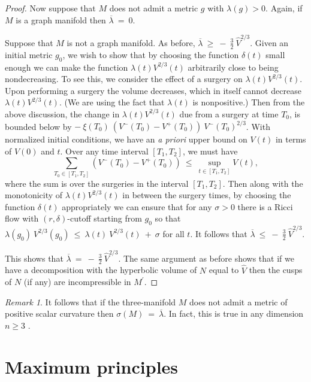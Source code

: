 \documentclass[12pt]{amsart}
\numberwithin{equation}{section}
\theoremstyle{plain}
\theoremstyle{definition}
\theoremstyle{remark}
\newtheorem{remark}[equation]{Remark}
\begin{document}
\begin{proof}
Now suppose that $M$ does not admit a metric $g$ with $\lambda(g) > 0$.
Again, if $M$ is a graph manifold then $\overline{\lambda} \: = \: 0$.

Suppose that $M$ is not a graph manifold.
As before, $\overline{\lambda} \: \ge \: - \: \frac32 \: \widehat{V}^{2/3}$.
Given an initial metric $g_0$,
we wish to show that by choosing the function $\delta(t)$ 
small enough we can make the function $\lambda(t) V^{2/3}(t)$
arbitrarily close to being nondecreasing. To see this, we consider
the effect of a surgery on $\lambda(t) V^{2/3}(t)$. Upon performing a surgery
the volume decreases, which in itself cannot decrease
$\lambda(t) V^{2/3}(t)$. (We are using the fact that $\lambda(t)$ is
nonpositive.) 
Then from the above discussion, the
change in $\lambda(t) V^{2/3}(t)$ due from a surgery at time $T_0$,
is bounded below by $- \: \xi(T_0) \: (V^-(T_0) - V^+(T_0)) \: 
V^-(T_0)^{2/3}$.
With normalized initial conditions,
we have an {\it a priori} upper bound on $V(t)$ in terms of $V(0)$ and $t$.
Over any time interval $[T_1, T_2]$, we must have
\begin{equation}
\sum_{T_0 \in [T_1, T_2]} \left( V^-(T_0) - V^+(T_0) \right) \: \le \: 
\sup_{t \in [T_1,T_2]} V(t),
\end{equation}
where the sum is over the surgeries in the
interval $[T_1,T_2]$.
Then along with the monotonicity of $\lambda(t) V^{2/3}(t)$ in between the
 surgery times,  by choosing the function
$\delta(t)$ appropriately we can ensure that 
for any 
$\sigma > 0$
there is a Ricci flow with $(r, \delta)$-cutoff
starting from $g_0$ so that
$\lambda(g_0) \: V^{2/3}(g_0) \: \le \: \lambda(t) \: V^{2/3}(t) \: + \:
\sigma$ for all $t$.
It follows that
$\overline{\lambda} \: \le \: - \: \frac32 \: \widehat{V}^{2/3}$.

This shows that $\overline{\lambda} \: = \: - \: \frac32 \: \widehat{V}^{2/3}$.
The same argument as before shows that if we have a decomposition
with the hyperbolic volume of $N$ equal to  $\widehat{V}$ then the cusps of $N$ 
(if any) are incompressible in $M^\prime$. 
\end{proof}

\begin{remark}
It follows that if the three-manifold $M$ does not admit a metric of positive scalar curvature then
$\sigma(M) \: = \: \overline{\lambda}$. In fact, this is true in any dimension
$n \ge 3$ \cite{Akutagawa-Ishida-Lebrun}.
\end{remark}

\appendix
\section{Maximum principles} \label{maxprin}
\end{document}
